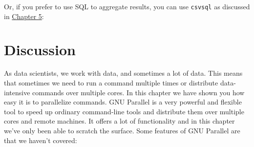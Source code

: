 \documentclass[
]{book}
\newenvironment{Shaded}{\begin{snugshade}}{\end{snugshade}}
\newcommand{\ExtensionTok}[1]{#1}
\newcommand{\FunctionTok}[1]{\textcolor[rgb]{0.00,0.00,0.00}{#1}}
\newcommand{\KeywordTok}[1]{\textcolor[rgb]{0.13,0.29,0.53}{\textbf{#1}}}
\newcommand{\NormalTok}[1]{#1}
\newcommand{\OperatorTok}[1]{\textcolor[rgb]{0.81,0.36,0.00}{\textbf{#1}}}
\newcommand{\StringTok}[1]{\textcolor[rgb]{0.31,0.60,0.02}{#1}}
\theoremstyle{definition}
\theoremstyle{definition}
\theoremstyle{definition}
\theoremstyle{remark}
\begin{document}
Or, if you prefer to use SQL to aggregate results, you can use \texttt{csvsql} as discussed in \protect\hyperlink{chapter-5-scrubbing-data}{Chapter 5}:

\begin{Shaded}
\end{Shaded}

\hypertarget{discussion}{%
\section{Discussion}\label{discussion}}

As data scientists, we work with data, and sometimes a lot of data. This means that sometimes we need to run a command multiple times or distribute data-intensive commands over multiple cores. In this chapter we have shown you how easy it is to parallelize commands. GNU Parallel is a very powerful and flexible tool to speed up ordinary command-line tools and distribute them over multiple cores and remote machines. It offers a lot of functionality and in this chapter we've only been able to scratch the surface. Some features of GNU Parallel are that we haven't covered:
\end{document}
